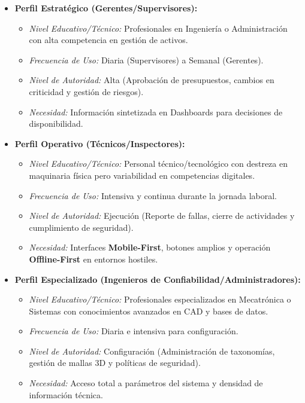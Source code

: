 \begin{itemize}
    \item \textbf{Perfil Estratégico (Gerentes/Supervisores):}
\begin{itemize}
    \item \textit{Nivel Educativo/Técnico:} Profesionales en Ingeniería o Administración con alta competencia en gestión de activos.
    \item \textit{Frecuencia de Uso:} Diaria (Supervisores) a Semanal (Gerentes).
    \item \textit{Nivel de Autoridad:} Alta (Aprobación de presupuestos, cambios en criticidad y gestión de riesgos).
    \item \textit{Necesidad:} Información sintetizada en Dashboards para decisiones de disponibilidad.
\end{itemize}
    \item \textbf{Perfil Operativo (Técnicos/Inspectores):}
\begin{itemize}
    \item \textit{Nivel Educativo/Técnico:} Personal técnico/tecnológico con destreza en maquinaria física pero variabilidad en competencias digitales.
    \item \textit{Frecuencia de Uso:} Intensiva y continua durante la jornada laboral.
    \item \textit{Nivel de Autoridad:} Ejecución (Reporte de fallas, cierre de actividades y cumplimiento de seguridad).
    \item \textit{Necesidad:} Interfaces \textbf{Mobile-First}, botones amplios y operación \textbf{Offline-First} en entornos hostiles.
\end{itemize}
    \item \textbf{Perfil Especializado (Ingenieros de Confiabilidad/Administradores):}
\begin{itemize}
    \item \textit{Nivel Educativo/Técnico:} Profesionales especializados en Mecatrónica o Sistemas con conocimientos avanzados en CAD y bases de datos.
    \item \textit{Frecuencia de Uso:} Diaria e intensiva para configuración.
    \item \textit{Nivel de Autoridad:} Configuración (Administración de taxonomías, gestión de mallas 3D y políticas de seguridad).
    \item \textit{Necesidad:} Acceso total a parámetros del sistema y densidad de información técnica.
\end{itemize}
\end{itemize}
